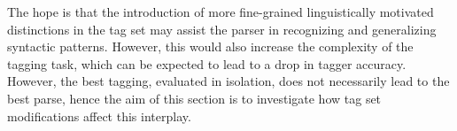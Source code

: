 \documentclass[11pt,a4paper]{article}
\begin{document}
The hope is that the introduction of more fine-grained linguistically motivated
distinctions in the tag set may assist the parser in recognizing and
generalizing syntactic patterns.  However, this would also increase the
complexity of the tagging task, which can be expected to lead to a drop in
tagger accuracy.  However, the best tagging, evaluated in isolation, does not
necessarily lead to the best parse, hence the aim of this section is to
investigate how tag set modifications affect this interplay.


\end{document}
